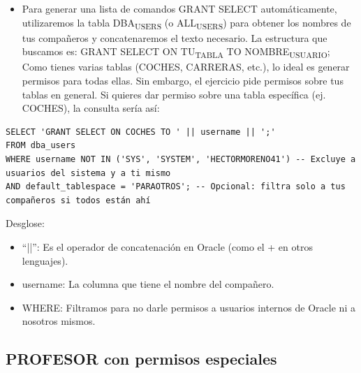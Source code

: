 \documentclass[11pt]{article}
\begin{document}
\begin{itemize}
\item Para generar una lista de comandos GRANT SELECT automáticamente, utilizaremos la tabla DBA\textsubscript{USERS} (o ALL\textsubscript{USERS}) para obtener los nombres de tus compañeros y concatenaremos el texto necesario.
La estructura que buscamos es: GRANT SELECT ON TU\textsubscript{TABLA} TO NOMBRE\textsubscript{USUARIO};
Como tienes varias tablas (COCHES, CARRERAS, etc.), lo ideal es generar permisos para todas ellas. Sin embargo, el ejercicio pide permisos sobre tus tablas en general. Si quieres dar permiso sobre una tabla específica (ej. COCHES), la consulta sería así:
\end{itemize}

\begin{verbatim}
SELECT 'GRANT SELECT ON COCHES TO ' || username || ';'
FROM dba_users
WHERE username NOT IN ('SYS', 'SYSTEM', 'HECTORMORENO41') -- Excluye a usuarios del sistema y a ti mismo
AND default_tablespace = 'PARAOTROS'; -- Opcional: filtra solo a tus compañeros si todos están ahí
\end{verbatim}
Desglose:

\begin{itemize}
\item ``||'': Es el operador de concatenación en Oracle (como el + en otros lenguajes).

\item username: La columna que tiene el nombre del compañero.

\item WHERE: Filtramos para no darle permisos a usuarios internos de Oracle ni a nosotros mismos.
\end{itemize}
\subsection{PROFESOR con permisos especiales}
\label{sec:org6d9bffa}
\end{document}
